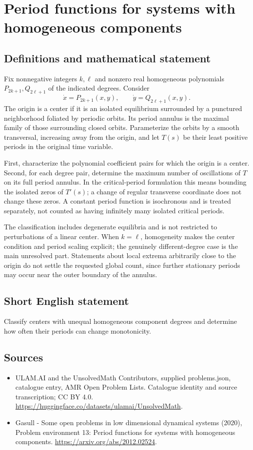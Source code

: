 \documentclass[11pt,a4paper]{article}
\begin{document}
\section*{Period functions for systems with homogeneous components}\label{statement}

\subsection{Definitions and mathematical statement}
Fix nonnegative integers $k,\ell$ and nonzero real homogeneous polynomials
$P_{2k+1},Q_{2\ell+1}$ of the indicated degrees. Consider
\[
 \dot x=P_{2k+1}(x,y),\qquad
 \dot y=Q_{2\ell+1}(x,y).
\]
The origin is a center if it is an isolated equilibrium surrounded by a
punctured neighborhood foliated by periodic orbits. Its period annulus is
the maximal family of those surrounding closed orbits. Parameterize the
orbits by a smooth transversal, increasing away from the origin, and let
$T(s)$ be their least positive periods in the original time variable.

First, characterize the polynomial coefficient pairs for which the origin
is a center. Second, for each degree pair, determine the maximum number of
oscillations of $T$ on its full period annulus. In the critical-period
formulation this means bounding the isolated zeros of $T'(s)$; a change of
regular transverse coordinate does not change these zeros. A constant
period function is isochronous and is treated separately, not counted as
having infinitely many isolated critical periods.

The classification includes degenerate equilibria and is not restricted to
perturbations of a linear center. When $k=\ell$, homogeneity makes the
center condition and period scaling explicit; the genuinely different-degree
case is the main unresolved part. Statements about local extrema arbitrarily
close to the origin do not settle the requested global count, since further
stationary periods may occur near the outer boundary of the annulus.
\subsection{Short English statement}
Classify centers with unequal homogeneous component degrees and determine how often their periods can change monotonicity.
\subsection{Sources}
\begin{itemize}
\item[S1] ULAM.AI and the UnsolvedMath Contributors, supplied problems.json, catalogue entry, AMR Open Problem Lists. Catalogue identity and source transcription; CC BY 4.0.
\url{https://huggingface.co/datasets/ulamai/UnsolvedMath}.
\item[S2] Gasull - Some open problems in low dimensional dynamical systems (2020), Problem environment 13: Period functions for systems with homogeneous components. 
\url{https://arxiv.org/abs/2012.02524}.
\end{itemize}
\end{document}
